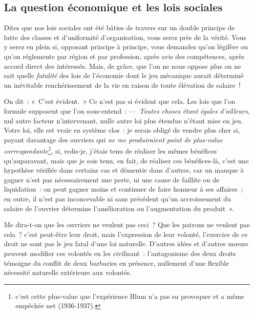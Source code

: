 \documentclass[french,twoside]{book} %
\newcommand{\astermono}{\medskip\centerline{\color{rubric}\large\selectfont{\syms ✻}}\medskip\par}%
\begin{document}
\subsection[La question économique et les lois sociales]{La question économique et les lois sociales}
\noindent Dites que nos lois sociales ont été bâties de travers sur un double principe de lutte des classes et d’uniformité d’organisation, vous serez près de la vérité. Vous y serez en plein si, opposant principe à principe, vous demandez qu’on légifère ou qu’on réglemente par région et par profession, après avis des compétences, après accord direct des intéressés. Mais, de grâce, que l’on ne nous oppose plus on ne sait quelle \emph{fatalité} des lois de l’économie dont le jeu mécanique aurait déterminé un inévitable renchérissement de la vie en raison de toute élévation de salaire !\par
On dit : « C’est évident. » Ce n’est pas si évident que cela. Les lois que l’on formule supposent que l’on sous-entend : — \emph{Toutes choses étant égales d’ailleurs}, nul autre facteur n’intervenant, nulle autre loi plus étendue n’étant mise en jeu. Votre loi, elle est vraie en système clos : je serais obligé de vendre plus cher si, payant davantage des ouvriers qui \emph{ne me produiraient point de plus-value correspondante}\footnote{c’est cette plus-value que l’expérience Blum n’a pas su provoquer et a même empêchée net (1936-1937).}, si, redis-je, j’étais tenu de réaliser les mêmes bénéfices qu’auparavant, mais que je sois tenu, en fait, de réaliser ces bénéfices-là, c’est une hypothèse vérifiée dans certains cas et démentie dans d’autres, car un manque à gagner n’est pas nécessairement une perte, ni une cause de faillite ou de liquidation : on peut gagner moins et continuer de faire honneur à ses affaires ; en outre, il n’est pas inconcevable ni sans précédent qu’un accroissement du salaire de l’ouvrier détermine l’amélioration ou l’augmentation du produit ».\par
Me dira-t-on que les ouvriers ne veulent pas ceci ? Que les patrons ne veulent pas cela ? c’est peut-être leur droit, mais l’expression de leur volonté, l’exercice de ce droit ne sont pas le jeu fatal d’une loi naturelle. D’autres idées et d’autres mœurs peuvent modifier ces volontés en les civilisant : l’antagonisme des deux droits témoigne du conflit de deux barbaries en présence, nullement d’une flexible nécessité naturelle extérieure aux volontés.\par

\astermono
\end{document}
